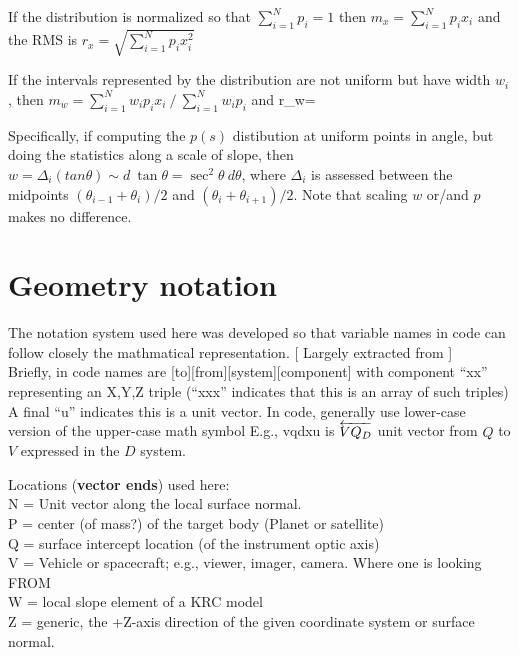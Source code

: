 \documentclass{article}
\begin{document}
If the distribution is normalized so that $\sum_{i=1}^N p_i =1$ 
 then  $ m_x=\sum_{i=1}^N p_i x_i $
 and the RMS is $ r_x=\sqrt{ \sum_{i=1}^N p_i x^2_i }$

\vspace{4.mm}

If the intervals represented by the distribution are not uniform but have width $w_i$, 
\qii then $ m_w=\sum_{i=1}^N w_ip_ix_i \ \big/ \ \sum_{i=1}^N w_ip_i$ and 
\qb r_w= \qe


Specifically, if computing the $p(s)$ distibution at uniform points in angle,
but doing the statistics along a scale of slope, then $w= \Delta_i (tan \theta)
\sim d \ \tan \theta = \sec ^2 \theta \ d \theta $, where $\Delta_i$ is assessed
between the midpoints $(\theta_{i-1}+ \theta_i )/2 $ and $(\theta_i +
\theta_{i+1} )/2 $. Note that scaling $w$ or/and $p$ makes no difference.

\section{Geometry notation }

 The notation system used here was developed so that variable names in code can
 follow closely the mathmatical representation.  [ Largely extracted from  ]  
\\ Briefly, in code names are [to][from][system][component] with component ``xx'' representing an X,Y,Z triple (``xxx'' indicates that this is an array of such triples)
\qi A final ``u'' indicates this is a unit vector. 
\qi In code, generally use lower-case version of the upper-case math symbol
\qi E.g., vqdxu is $\overleftarrow{VQ_D}$ unit vector from $Q$ to $V$ expressed in the $D$ system.

\vspace{2.mm}
Locations (\textbf{vector ends}) used here:
\\ N = Unit vector along the local surface normal.
\\ P = center (of mass?) of the target body (Planet or satellite)
\\ Q = surface intercept location (of the instrument optic axis)
\\ V = Vehicle or spacecraft; e.g., viewer, imager, camera. Where one is looking FROM
\\ W = local slope element of a KRC model
\\ Z = generic, the +Z-axis direction of the given coordinate system or surface normal.
 
\end{document}

